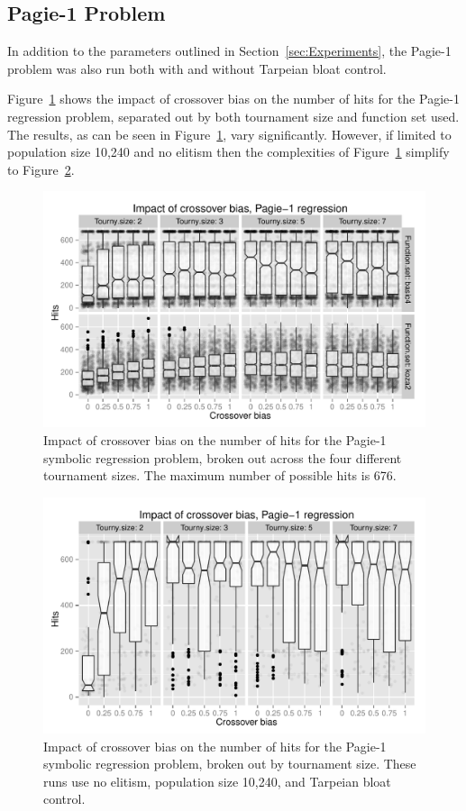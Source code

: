 \documentclass{sig-alternate}
\begin{document}
\subsection{Pagie-1 Problem}

In addition to the parameters outlined in Section~\ref{sec:Experiments}, the Pagie-1 problem was 
also run both with and without Tarpeian bloat control.

Figure~\ref{fig:Pagie1Hits_Bias_Tournys_FunctionSet} shows the impact of crossover bias on the number of hits for the
Pagie-1 regression problem, separated out by both tournament size and function set used. The results, as 
can be seen in Figure~\ref{fig:Pagie1Hits_Bias_Tournys_FunctionSet}, vary significantly. However, if limited 
to population size 10,240 and no elitism then the complexities of 
Figure~\ref{fig:Pagie1Hits_Bias_Tournys_FunctionSet} simplify to
Figure~\ref{fig:Pagie1StrongHits_Bias_Tournys_FunctionSet}.

\begin{figure}
\centering
\includegraphics[width=0.45 \textwidth]{Plots/Pagie_1_Hits_vs_Bias_Tournys_FunctionSet.pdf}
\caption{Impact of crossover bias on the number of hits for the Pagie-1 symbolic regression problem, 
	broken out across the four different tournament sizes. The maximum number of possible hits is 676.}
\label{fig:Pagie1Hits_Bias_Tournys_FunctionSet}
\end{figure}

\begin{figure}
\centering
\includegraphics[width=0.45 \textwidth]{Plots/Pagie_1_strong_Hits_vs_Bias_Tournys_FunctionSet.pdf}
\caption{Impact of crossover bias on the number of hits for the Pagie-1 symbolic regression problem, 
	broken out by tournament size. These runs use no elitism, 
	population size 10,240, and Tarpeian bloat control.}
\label{fig:Pagie1StrongHits_Bias_Tournys_FunctionSet}
\end{figure}
\end{document}
